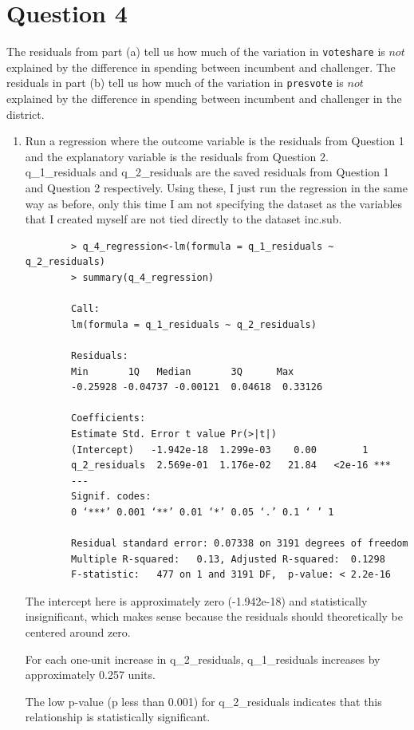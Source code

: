 \documentclass[12pt,letterpaper]{article}
\begin{document}
\section*{Question 4}
\noindent The residuals from part (a) tell us how much of the variation in \texttt{voteshare} is $not$ explained by the difference in spending between incumbent and challenger. The residuals in part (b) tell us how much of the variation in \texttt{presvote} is $not$ explained by the difference in spending between incumbent and challenger in the district.
	\begin{enumerate}
		\item Run a regression where the outcome variable is the residuals from Question 1 and the explanatory variable is the residuals from Question 2. \\
		
		q\_1\_residuals and q\_2\_residuals are the saved residuals from Question 1 and Question 2 respectively. Using these, I just run the regression in the same way as before, only this time I am not specifying the dataset as the variables that I created myself are not tied directly to the dataset inc.sub.
			\begin{verbatim}
		> q_4_regression<-lm(formula = q_1_residuals ~ q_2_residuals)
		> summary(q_4_regression)
		
		Call:
		lm(formula = q_1_residuals ~ q_2_residuals)
		
		Residuals:
		Min       1Q   Median       3Q      Max 
		-0.25928 -0.04737 -0.00121  0.04618  0.33126 
		
		Coefficients:
		Estimate Std. Error t value Pr(>|t|)    
		(Intercept)   -1.942e-18  1.299e-03    0.00        1    
		q_2_residuals  2.569e-01  1.176e-02   21.84   <2e-16 ***
		---
		Signif. codes:  
		0 ‘***’ 0.001 ‘**’ 0.01 ‘*’ 0.05 ‘.’ 0.1 ‘ ’ 1
		
		Residual standard error: 0.07338 on 3191 degrees of freedom
		Multiple R-squared:   0.13,	Adjusted R-squared:  0.1298 
		F-statistic:   477 on 1 and 3191 DF,  p-value: < 2.2e-16
	\end{verbatim}
	
	The intercept here is approximately zero (-1.942e-18) and statistically insignificant, which makes sense because the residuals should theoretically be centered around zero. 
	
	For each one-unit increase in q\_2\_residuals, q\_1\_residuals increases by approximately 0.257 units.
	
	The low p-value (p less than 0.001) for q\_2\_residuals indicates that this relationship is statistically significant.
	

\end{enumerate}
\end{document}
